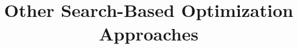 \title{Other Search-Based Optimization Approaches}
\label{chp:other-search-based-optimization-approaches}
\author{}
\institute{}
\maketitle